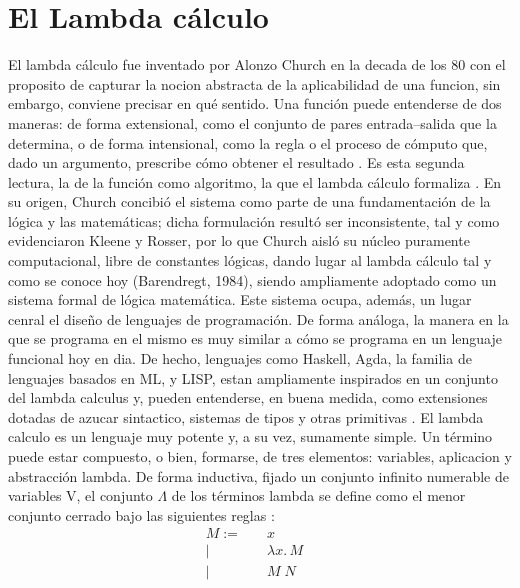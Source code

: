 \documentclass[a4paper,12pt]{report}
\theoremstyle{definition}
\theoremstyle{plain}
\theoremstyle{remark}
\begin{document}
\section{El Lambda c\'alculo}
El lambda cálculo fue inventado por Alonzo Church en la decada de los 80 con el proposito de capturar la nocion abstracta de la aplicabilidad de una funcion, sin embargo, conviene precisar en qué sentido. Una función puede entenderse de dos maneras: de forma extensional, como el conjunto de pares entrada–salida que la determina, o de forma intensional, como la regla o el proceso de cómputo que, dado un argumento, prescribe cómo obtener el resultado \citep{geuvers2014}. Es esta segunda lectura, la de la función como algoritmo, la que el lambda cálculo formaliza \citep{barendregt1984, geuvers2014}. En su origen, Church concibió el sistema como parte de una fundamentación de la lógica y las matemáticas; dicha formulación resultó ser inconsistente, tal y como evidenciaron Kleene y Rosser, por lo que Church aisló su núcleo puramente computacional, libre de constantes lógicas, dando lugar al lambda cálculo tal y como se conoce hoy (Barendregt, 1984), siendo ampliamente adoptado como un sistema formal de lógica matemática.
\newline
\newline
Este sistema ocupa, además, un lugar cenral el diseño de lenguajes de programación. De forma análoga, la manera en la que se programa en el mismo es muy similar a cómo se programa en un lenguaje funcional hoy en dia. De hecho, lenguajes como Haskell, Agda, la familia de lenguajes basados en ML, y LISP, estan ampliamente inspirados en un conjunto del lambda calculus y, pueden entenderse, en buena medida, como extensiones  dotadas de azucar sintactico, sistemas de tipos y otras primitivas \citep{pierce2002}.
\newline
\newline
El lambda calculo es un lenguaje muy potente y, a su vez, sumamente simple. Un término puede estar compuesto, o bien, formarse, de tres elementos: variables, aplicacion y abstracción lambda. De forma inductiva, fijado un conjunto infinito numerable de variables V, el conjunto $\Lambda$ de los términos lambda se define como el menor conjunto cerrado bajo las siguientes reglas \citep{barendregt1984, pierce2002}:
\begin{align}
  M := \quad & x & \tag{1}\\
  \mid \quad & \lambda x.\, M & \tag{2}\\
  \mid \quad & M \; N \tag{3}&
\end{align}
\end{document}
